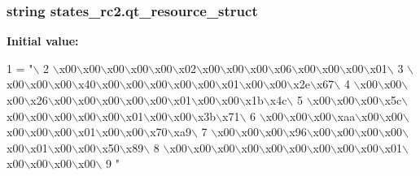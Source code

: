 \subsubsection[{qt\+\_\+resource\+\_\+struct}]{\setlength{\rightskip}{0pt plus 5cm}string states\+\_\+rc2.\+qt\+\_\+resource\+\_\+struct}\label{namespacestates__rc2_ae217b314fc99236d927478705d869fa0}
{\bfseries Initial value\+:}
\begin{DoxyCode}
1 = \textcolor{stringliteral}{"\(\backslash\)}
2 \textcolor{stringliteral}{\(\backslash\)x00\(\backslash\)x00\(\backslash\)x00\(\backslash\)x00\(\backslash\)x00\(\backslash\)x02\(\backslash\)x00\(\backslash\)x00\(\backslash\)x00\(\backslash\)x06\(\backslash\)x00\(\backslash\)x00\(\backslash\)x00\(\backslash\)x01\(\backslash\)}
3 \textcolor{stringliteral}{\(\backslash\)x00\(\backslash\)x00\(\backslash\)x00\(\backslash\)x40\(\backslash\)x00\(\backslash\)x00\(\backslash\)x00\(\backslash\)x00\(\backslash\)x00\(\backslash\)x01\(\backslash\)x00\(\backslash\)x00\(\backslash\)x2e\(\backslash\)x67\(\backslash\)}
4 \textcolor{stringliteral}{\(\backslash\)x00\(\backslash\)x00\(\backslash\)x00\(\backslash\)x26\(\backslash\)x00\(\backslash\)x00\(\backslash\)x00\(\backslash\)x00\(\backslash\)x00\(\backslash\)x01\(\backslash\)x00\(\backslash\)x00\(\backslash\)x1b\(\backslash\)x4c\(\backslash\)}
5 \textcolor{stringliteral}{\(\backslash\)x00\(\backslash\)x00\(\backslash\)x00\(\backslash\)x5c\(\backslash\)x00\(\backslash\)x00\(\backslash\)x00\(\backslash\)x00\(\backslash\)x00\(\backslash\)x01\(\backslash\)x00\(\backslash\)x00\(\backslash\)x3b\(\backslash\)x71\(\backslash\)}
6 \textcolor{stringliteral}{\(\backslash\)x00\(\backslash\)x00\(\backslash\)x00\(\backslash\)xaa\(\backslash\)x00\(\backslash\)x00\(\backslash\)x00\(\backslash\)x00\(\backslash\)x00\(\backslash\)x01\(\backslash\)x00\(\backslash\)x00\(\backslash\)x70\(\backslash\)xa9\(\backslash\)}
7 \textcolor{stringliteral}{\(\backslash\)x00\(\backslash\)x00\(\backslash\)x00\(\backslash\)x96\(\backslash\)x00\(\backslash\)x00\(\backslash\)x00\(\backslash\)x00\(\backslash\)x00\(\backslash\)x01\(\backslash\)x00\(\backslash\)x00\(\backslash\)x50\(\backslash\)x89\(\backslash\)}
8 \textcolor{stringliteral}{\(\backslash\)x00\(\backslash\)x00\(\backslash\)x00\(\backslash\)x00\(\backslash\)x00\(\backslash\)x00\(\backslash\)x00\(\backslash\)x00\(\backslash\)x00\(\backslash\)x01\(\backslash\)x00\(\backslash\)x00\(\backslash\)x00\(\backslash\)x00\(\backslash\)}
9 \textcolor{stringliteral}{"}
\end{DoxyCode}
